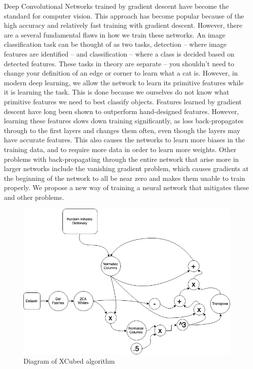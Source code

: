 \documentclass{article}
\begin{document}
Deep Convolutional Networks trained by gradient descent have become the standard for computer vision. This approach has become popular because of the high accuracy and relatively fast training with gradient descent.\cite{alexnet}\cite{Lecun98gradient} However, there are a several fundamental flaws in how we train these networks. An image classification task can be thought of as two tasks, detection -- where image features are identified -- and classification -- where a class is decided based on detected features. These tasks in theory are separate -- you shouldn't need to change your definition of an edge or corner to learn what a cat is.\cite{something} However, in modern deep learning, we allow the network to learn its primitive features while it is learning the task. This is done because we ourselves do not know what primitive features we need to best classify objects. Features learned by gradient descent have long been shown to outperform hand-designed features.\cite{learnvcraft} However, learning these features slows down training significantly, as loss back-propagates through to the first layers and changes them often, even though the layers may have accurate features. This also causes the networks to learn more biases in the training data, and to require more data in order to learn more weights. Other problems with back-propagating through the entire network that arise more in larger networks include the vanishing gradient problem, which causes gradients at the beginning of the network to all be near zero and makes them unable to train properly.\cite{vanishinggradients}\cite{learningproblems} We propose a new way of training a neural network that mitigates these and other problems.
\newline
\begin{figure}
    \centering
    \includegraphics[width=.8\linewidth]{XCubed_diagram}
    \caption{Diagram of XCubed algorithm}
    \label{fig:diagram}
\end{figure}
\end{document}
